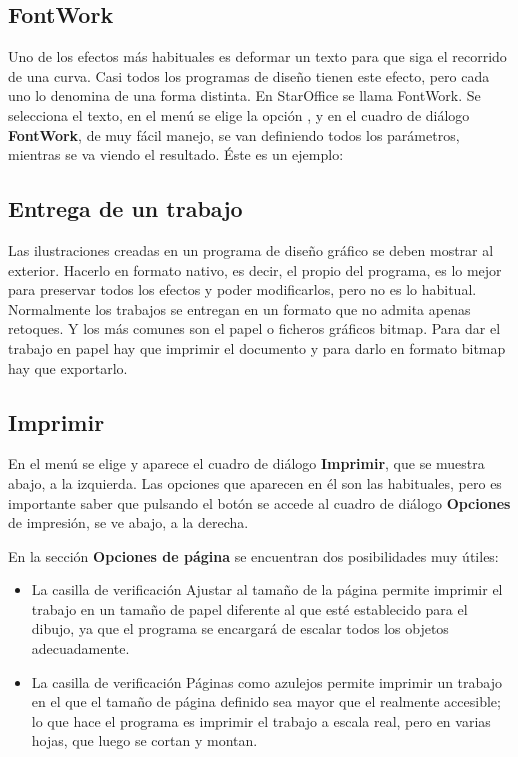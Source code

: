 \subsection{FontWork}

Uno de los efectos más habituales es deformar un texto para que siga
el recorrido de una curva. Casi todos los programas de diseño tienen
este efecto, pero cada uno lo denomina de una forma distinta. En
StarOffice se llama FontWork. Se selecciona el texto, en el menú
 se elige la opción , y en el cuadro de
diálogo \textbf{FontWork}, de muy fácil manejo, se van definiendo
todos los parámetros, mientras se va viendo el resultado. Éste es un
ejemplo:

\subsection{Entrega de un trabajo}

Las ilustraciones creadas en un programa de diseño gráfico se deben
mostrar al exterior. Hacerlo en formato nativo, es decir, el propio
del programa, es lo mejor para preservar todos los efectos y poder
modificarlos, pero no es lo habitual. Normalmente los trabajos se
entregan en un formato que no admita apenas retoques. Y los más
comunes son el papel o ficheros gráficos bitmap. Para dar el trabajo
en papel hay que imprimir el documento y para darlo en formato bitmap
hay que exportarlo.

\subsection{Imprimir}

En el menú  se elige  y aparece el cuadro
de diálogo \textbf{Imprimir}, que se muestra abajo, a la
izquierda. Las opciones que aparecen en él son las habituales, pero es
importante saber que pulsando el botón  se accede al
cuadro de diálogo \textbf{Opciones} de impresión, se ve abajo, a la
derecha.

En la sección \textbf{Opciones de página} se encuentran dos
posibilidades muy útiles:

\begin{itemize}
\item La casilla de verificación Ajustar al tamaño de la página 
permite imprimir el trabajo en un tamaño de papel diferente al 
que esté establecido para el dibujo, ya que el programa se encargará 
de escalar todos los objetos adecuadamente.

\item La casilla de verificación Páginas como azulejos permite 
imprimir un trabajo en el que el tamaño de página definido sea mayor 
que el realmente accesible; lo que hace el programa es imprimir el 
trabajo a escala real, pero en varias hojas, que luego se cortan y 
montan.
\end{itemize}

